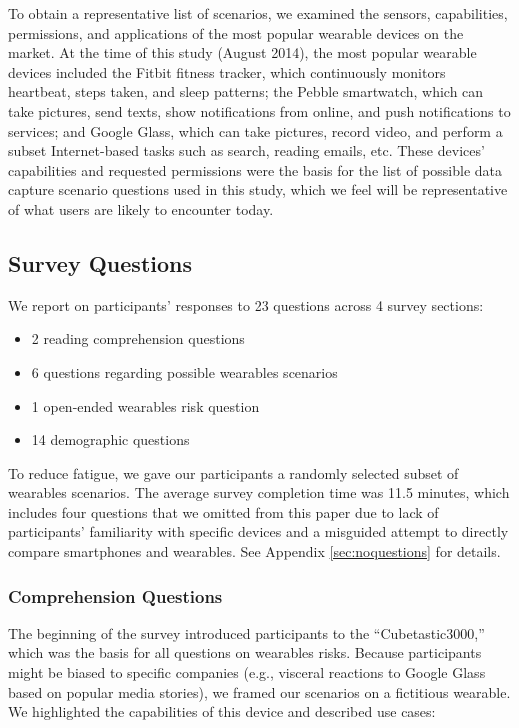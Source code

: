 \documentclass[conference]{IEEEtran}
\begin{document}
To obtain a representative list of scenarios, we examined the sensors, capabilities, permissions, and applications of the most popular wearable devices on the market. At the time of this study (August 2014), the most popular wearable devices included the Fitbit fitness tracker, which continuously monitors heartbeat, steps taken, and sleep patterns; the Pebble smartwatch, which can take pictures, send texts, show notifications from online, and push notifications to services; and Google Glass, which can take pictures, record video, and perform a subset Internet-based tasks such as search, reading emails, etc. These devices' capabilities and requested permissions were the basis for the list of possible data capture scenario questions used in this study, which we feel will be representative of what users are likely to encounter today.

\subsection{Survey Questions}
\noindent We report on participants' responses to 23 questions across 4 survey sections:  \\[-.5cm]

\begin{itemize} \itemsep1pt \parskip0pt 
\item 2 reading comprehension questions
\item 6 questions regarding possible wearables scenarios
\item 1 open-ended wearables risk question
\item 14 demographic questions %
\end{itemize}

To reduce fatigue, we gave our participants a randomly selected subset of wearables scenarios. The average survey completion time was 11.5 minutes, which includes four questions that we omitted from this paper due to lack of participants' familiarity with specific devices and a misguided attempt to directly compare smartphones and wearables. See Appendix \ref{sec:noquestions} for details.

\subsubsection{Comprehension Questions}
The beginning of the survey introduced participants to the ``Cubetastic3000,'' which was the basis for all questions on wearables risks. Because participants might be biased to specific companies (e.g., visceral reactions to Google Glass based on popular media stories), we framed our scenarios on a fictitious wearable. We highlighted the capabilities of this device and described use cases:
\end{document}
